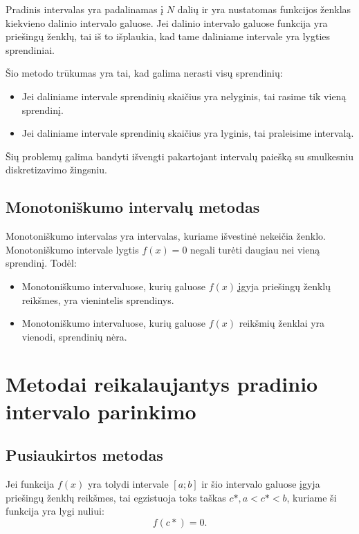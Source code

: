 Pradinis intervalas yra padalinamas į $N$ dalių ir yra nustatomas
funkcijos ženklas kiekvieno dalinio intervalo galuose. Jei dalinio
intervalo galuose funkcija yra priešingų ženklų, tai iš to
išplaukia, kad tame daliniame intervale yra lygties sprendiniai.

Šio metodo trūkumas yra tai, kad galima nerasti visų sprendinių:
\begin{itemize}
  \item Jei daliniame intervale sprendinių skaičius yra nelyginis, tai
    rasime tik vieną sprendinį.
  \item Jei daliniame intervale sprendinių skaičius yra lyginis, tai
    praleisime intervalą.
\end{itemize}
Šių problemų galima bandyti išvengti pakartojant intervalų paiešką su
smulkesniu diskretizavimo žingsniu.


\subsection{Monotoniškumo intervalų metodas}

Monotoniškumo intervalas yra intervalas, kuriame išvestinė nekeičia
ženklo. Monotoniškumo intervale lygtis $f(x) = 0$ negali turėti
daugiau nei vieną sprendinį. Todėl:
\begin{itemize}
  \item Monotoniškumo intervaluose, kurių galuose $f(x)$ ̨įgyja priešingų
    ženklų reikšmes, yra vienintelis sprendinys.
  \item Monotoniškumo intervaluose, kurių galuose $f(x)$ reikšmių ženklai
    yra vienodi, sprendinių nėra.
\end{itemize}


\section{Metodai reikalaujantys pradinio intervalo parinkimo}

\subsection{Pusiaukirtos metodas}

\cite[19-22]{textbook}

\begin{prop}
  Jei funkcija $f(x)$ yra tolydi intervale $\left[ a; b \right]$ ir šio
  intervalo galuose įgyja priešingų ženklų reikšmes, tai egzistuoja toks
  taškas $c*, a < c* < b$, kuriame ši funkcija yra lygi nuliui:
  \begin{equation*}
    f(c*) = 0.
  \end{equation*}
\end{prop}

